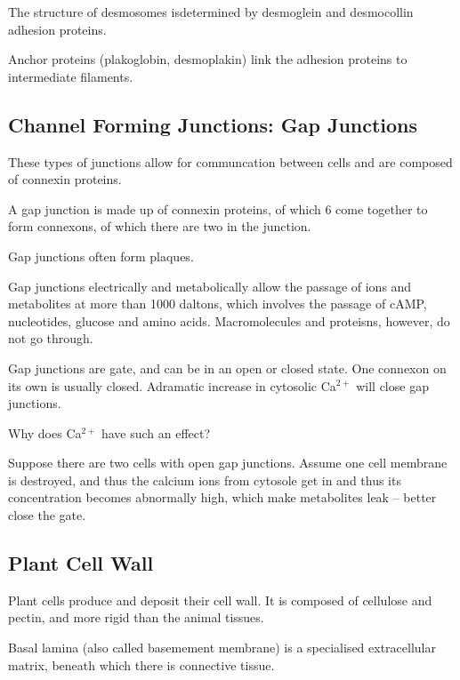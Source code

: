 \documentclass[11pt]{scrartcl}
\begin{document}
The structure of desmosomes isdetermined by desmoglein and desmocollin adhesion proteins.

Anchor proteins (plakoglobin, desmoplakin) link the adhesion proteins
to intermediate filaments.

\subsection{Channel Forming Junctions: Gap Junctions}

These types of junctions allow for communcation between cells and are composed of connexin proteins.

A gap junction is made up of connexin proteins, of which 6 come
together to form connexons, of which there are two in the junction.

Gap junctions often form plaques. 

Gap junctions electrically and metabolically allow the passage of ions and metabolites at more than 1000 daltons, which involves the passage of cAMP, nucleotides, glucose and amino acids. Macromolecules and proteisns, however, do not go through.

Gap junctions are gate, and can be in an open or closed state. One connexon on its own is usually closed. Adramatic increase in cytosolic Ca$^{2+}$ will close gap junctions.

Why does Ca$^{2+}$ have such an effect?

Suppose there are two cells with open gap junctions. Assume one cell
membrane is destroyed, and thus the calcium ions from cytosole get in and thus its concentration becomes abnormally high, which make metabolites leak -- better close the gate.

\subsection{Plant Cell Wall}

Plant cells produce and deposit their cell wall. It is composed of
cellulose and pectin, and more rigid than the animal tissues.



Basal lamina (also called basemement membrane) is a specialised
extracellular matrix, beneath which there is connective tissue.
\end{document}
